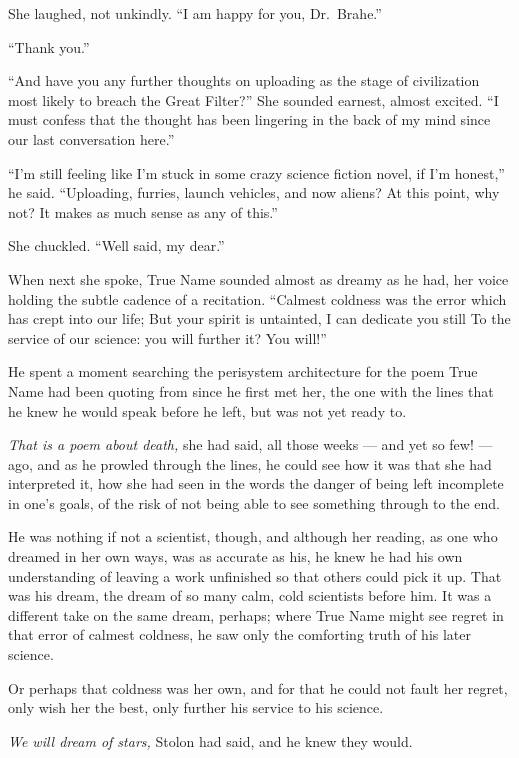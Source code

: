 She laughed, not unkindly. ``I am happy for you, Dr.~Brahe.''

``Thank you.''

``And have you any further thoughts on uploading as the stage of civilization most likely to breach the Great Filter?'' She sounded earnest, almost excited. ``I must confess that the thought has been lingering in the back of my mind since our last conversation here.''

``I'm still feeling like I'm stuck in some crazy science fiction novel, if I'm honest,'' he said. ``Uploading, furries, launch vehicles, and now aliens? At this point, why not? It makes as much sense as any of this.''

She chuckled. ``Well said, my dear.''

When next she spoke, True Name sounded almost as dreamy as he had, her voice holding the subtle cadence of a recitation. ``Calmest coldness was the error which has crept into our life; But your spirit is untainted, I can dedicate you still To the service of our science: you will further it? You will!''

He spent a moment searching the perisystem architecture for the poem True Name had been quoting from since he first met her, the one with the lines that he knew he would speak before he left, but was not yet ready to.

\emph{That is a poem about death,} she had said, all those weeks — and yet so few! — ago, and as he prowled through the lines, he could see how it was that she had interpreted it, how she had seen in the words the danger of being left incomplete in one's goals, of the risk of not being able to see something through to the end.

He was nothing if not a scientist, though, and although her reading, as one who dreamed in her own ways, was as accurate as his, he knew he had his own understanding of leaving a work unfinished so that others could pick it up. That was his dream, the dream of so many calm, cold scientists before him. It was a different take on the same dream, perhaps; where True Name might see regret in that error of calmest coldness, he saw only the comforting truth of his later science.

Or perhaps that coldness was her own, and for that he could not fault her regret, only wish her the best, only further his service to his science.

\emph{We will dream of stars,} Stolon had said, and he knew they would.
